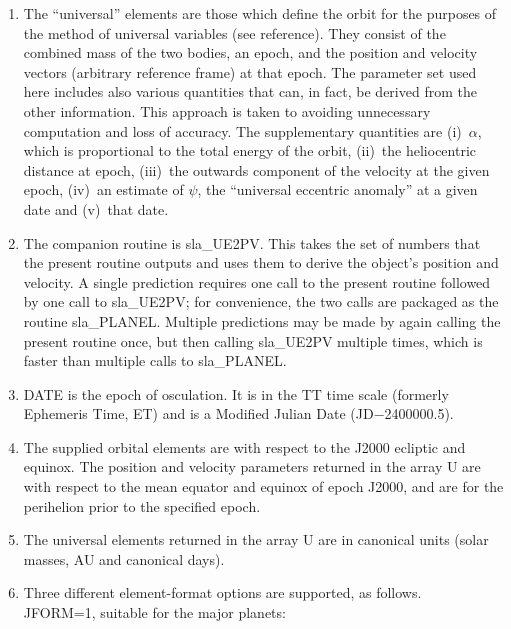 \documentclass[11pt,twoside,nolof]{starlink}
\begin{document}
{
 \begin{enumerate}
  \item The ``universal'' elements are those which define the orbit for
        the purposes of the method of universal variables (see reference).
        They consist of the combined mass of the two bodies, an epoch,
        and the position and velocity vectors (arbitrary reference frame)
        at that epoch.  The parameter set used here includes also various
        quantities that can, in fact, be derived from the other
        information.  This approach is taken to avoiding unnecessary
        computation and loss of accuracy.  The supplementary quantities
        are (i)~$\alpha$, which is proportional to the total energy of the
        orbit, (ii)~the heliocentric distance at epoch,
        (iii)~the outwards component of the velocity at the given epoch,
        (iv)~an estimate of $\psi$, the ``universal eccentric anomaly'' at a
        given date and (v)~that date.
  \item The companion routine is sla\_UE2PV.  This takes the set of numbers
        that the present routine outputs and uses them to derive the
        object's position and velocity.  A single prediction requires one
        call to the present routine followed by one call to sla\_UE2PV;
        for convenience, the two calls are packaged as the routine
        sla\_PLANEL.  Multiple predictions may be made by again calling the
        present routine once, but then calling sla\_UE2PV multiple times,
        which is faster than multiple calls to sla\_PLANEL.
  \item DATE is the epoch of osculation.  It is in the TT time scale
        (formerly Ephemeris Time, ET) and is a Modified Julian Date
        (JD$-$2400000.5).
  \item The supplied orbital elements are with respect to the J2000
        ecliptic and equinox.  The position and velocity parameters
        returned in the array U are with respect to the mean equator and
        equinox of epoch J2000, and are for the perihelion prior to the
        specified epoch.
  \item The universal elements returned in the array U are in canonical
        units (solar masses, AU and canonical days).
  \item Three different element-format options are supported, as
        follows. \\

        JFORM=1, suitable for the major planets:


\end{enumerate}}
\end{document}
